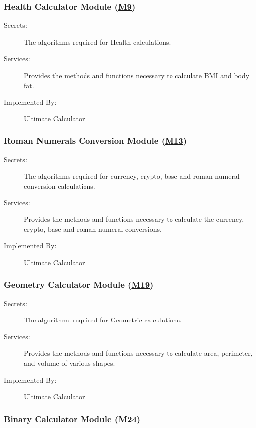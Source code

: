 \documentclass[12pt, titlepage]{article}
\begin{document}
\subsubsection{Health Calculator Module (\hyperref[m9]{M9})}

\begin{description}
\item[Secrets:]The algorithms required for Health calculations.
\item[Services:] Provides the methods and functions necessary to calculate BMI and body fat.
\item[Implemented By:] Ultimate Calculator
\end{description}

\subsubsection{Roman Numerals Conversion Module (\hyperref[m13]{M13})}

\begin{description}
\item[Secrets:]The algorithms required for currency, crypto, base and roman numeral conversion calculations.
\item[Services:] Provides the methods and functions necessary to calculate the currency, crypto, base and roman numeral conversions. 
\item[Implemented By:] Ultimate Calculator
\end{description}

\subsubsection{Geometry Calculator Module (\hyperref[m19]{M19})}

\begin{description}
\item[Secrets:]The algorithms required for Geometric calculations.
\item[Services:] Provides the methods and functions necessary to calculate area, perimeter, and volume of various shapes.
\item[Implemented By:] Ultimate Calculator
\end{description}

\subsubsection{Binary Calculator Module (\hyperref[m24]{M24})}
\end{document}
